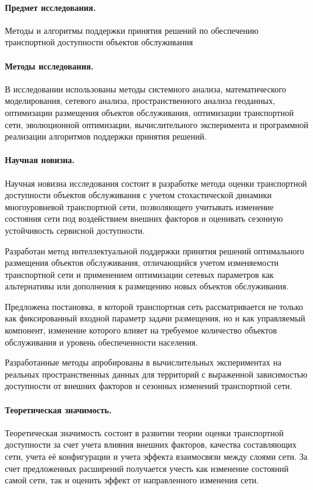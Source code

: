\paragraph*{Предмет исследования.}
Методы и алгоритмы поддержки принятия решений по обеспечению транспортной доступности объектов обслуживания

\paragraph*{Методы исследования.}
В исследовании использованы методы системного анализа, математического моделирования, сетевого анализа, пространственного анализа геоданных, оптимизации размещения объектов обслуживания, оптимизации транспортной сети, эволюционной оптимизации, вычислительного эксперимента и программной реализации алгоритмов поддержки принятия решений.

\paragraph*{Научная новизна.}
Научная новизна исследования состоит в разработке метода оценки транспортной доступности объектов обслуживания с учетом стохастической динамики многоуровневой транспортной сети, позволяющего учитывать изменение состояния сети под воздействием внешних факторов и оценивать сезонную устойчивость сервисной доступности.

Разработан метод интеллектуальной поддержки принятия решений оптимального размещения объектов обслуживания, отличающийся учетом изменяемости транспортной сети и применением оптимизации сетевых параметров как альтернативы или дополнения к размещению новых объектов обслуживания.

Предложена постановка, в которой транспортная сеть рассматривается не только как фиксированный входной параметр задачи размещения, но и как управляемый компонент, изменение которого влияет на требуемое количество объектов обслуживания и уровень обеспеченности населения.

Разработанные методы апробированы в вычислительных экспериментах на реальных пространственных данных для территорий с выраженной зависимостью доступности от внешних факторов и сезонных изменений транспортной сети.

\paragraph*{Теоретическая значимость.}

Теоретическая значимость состоит в развитии теории оценки транспортной доступности за счет учета влияния внешних факторов, качества составляющих сети, учета её конфигурации и учета эффекта взаимосвязи между слоями сети. За счет предложенных расширений получается учесть как изменение состояний самой сети, так и оценить эффект от направленного изменения сети.

